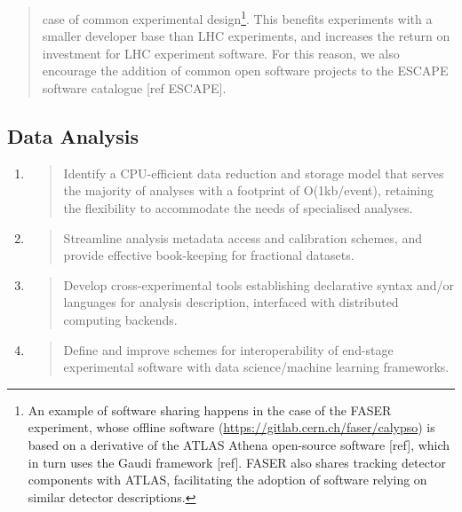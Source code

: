 \documentclass[10pt,a4paper]{article}
\begin{document}
\begin{enumerate}
\begin{quote}
  case of common experimental design\footnote{An example of software
    sharing happens in the case of the FASER experiment, whose offline
    software
    (\href{https://gitlab.cern.ch/faser/calypso}{{https://gitlab.cern.ch/faser/calypso}})
    is based on a derivative of the ATLAS Athena open-source software
    {[}ref{]}, which in turn uses the Gaudi framework {[}ref{]}. FASER
    also shares tracking detector components with ATLAS, facilitating
    the adoption of software relying on similar detector descriptions.}.
  This benefits experiments with a smaller developer base than LHC
  experiments, and increases the return on investment for LHC experiment
  software. For this reason, we also encourage the addition of common
  open software projects to the ESCAPE software catalogue {[}ref
  ESCAPE{]}.
  \end{quote}
\end{enumerate}

\hypertarget{data-analysis-1}{%
\subsection{Data Analysis}\label{data-analysis-1}}

\begin{enumerate}
\def\labelenumi{\arabic{enumi}.}
\item
  \begin{quote}
  Identify a CPU-efficient data reduction and storage model that serves
  the majority of analyses with a footprint of O(1kb/event), retaining
  the flexibility to accommodate the needs of specialised analyses.
  \end{quote}
\item
  \begin{quote}
  Streamline analysis metadata access and calibration schemes, and
  provide effective book-keeping for fractional datasets.
  \end{quote}
\item
  \begin{quote}
  Develop cross-experimental tools establishing declarative syntax
  and/or languages for analysis description, interfaced with distributed
  computing backends.
  \end{quote}
\item
  \begin{quote}
  Define and improve schemes for interoperability of end-stage
  experimental software with data science/machine learning frameworks.
  \end{quote}
\end{enumerate}
\end{document}
